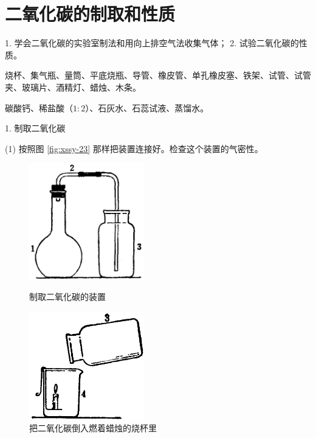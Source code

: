 \section{二氧化碳的制取和性质}\label{sec:xssy-sy5}

\begin{shiyanmudi}
    1. 学会二氧化碳的实验室制法和用向上排空气法收集气体； 2. 试验二氧化碳的性质。
\end{shiyanmudi}


\begin{shiyanyongpin}
    烧杯、集气瓶、量筒、平底烧瓶、导管、橡皮管、单孔橡皮塞、铁架、试管、试管夹、玻璃片、酒精灯、蜡烛、木条。

    碳酸钙、稀盐酸（$1:2$）、石灰水、石蕊试液、蒸馏水。
\end{shiyanyongpin}


\begin{shiyanbuzhou}
    1. 制取二氧化碳

    (1) 按照图 \ref{fig:xssy-23} 那样把装置连接好。检查这个装置的气密性。

    \begin{figure}[htbp]
        \centering
        \begin{minipage}[b]{7cm}
            \centering
            \includegraphics[width=5cm]{../pic/czhx1-xssy-23}
            \caption{制取二氧化碳的装置}\label{fig:xssy-23}
        \end{minipage}
        \qquad
        \begin{minipage}[b]{7cm}
            \centering
            \includegraphics[width=5cm]{../pic/czhx1-xssy-24}
            \caption{把二氧化碳倒入燃着蜡烛的烧杯里}\label{fig:xssy-24}
        \end{minipage}
    \end{figure}


\end{shiyanbuzhou}
